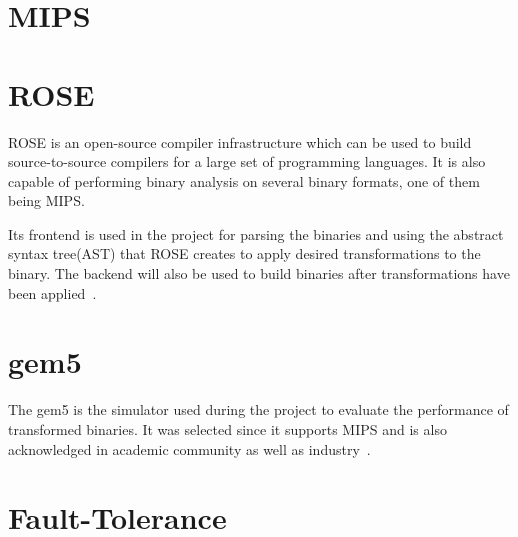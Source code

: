 \section{MIPS}

\section{ROSE}
ROSE is an open-source compiler infrastructure which can be used to build
source-to-source compilers for a large set of programming languages.
It is also capable of performing binary analysis on several
binary formats, one of them being MIPS.
%

Its frontend is used in the project for parsing the binaries and using
the abstract syntax tree(AST) that ROSE creates to apply desired
transformations to the binary. The backend will also be used to build
binaries after transformations have been applied~\cite{rose}.

\section{gem5}
The gem5 is the simulator used during the project to evaluate the performance
of transformed binaries. It was selected since it supports MIPS and
is also acknowledged in academic community as well as industry~\cite{gem5}.

\section{Fault-Tolerance}

